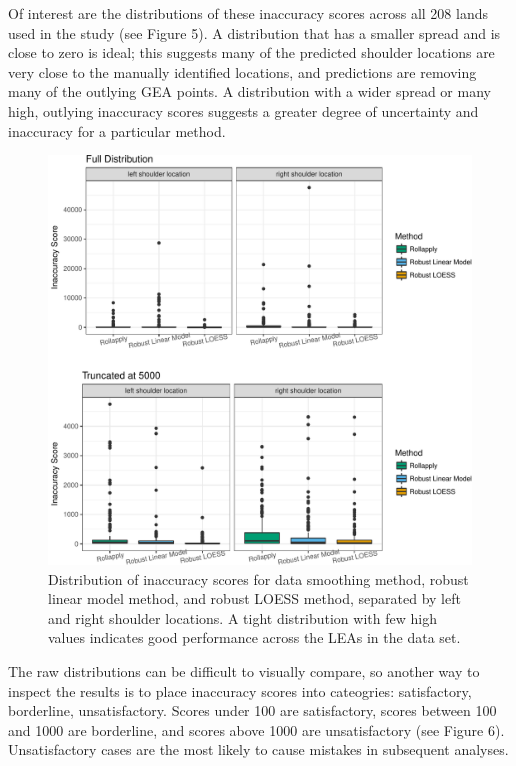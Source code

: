 \documentclass[]{article}
\begin{document}
Of interest are the distributions of these inaccuracy scores across all
208 lands used in the study (see Figure 5). A distribution that has a
smaller spread and is close to zero is ideal; this suggests many of the
predicted shoulder locations are very close to the manually identified
locations, and predictions are removing many of the outlying GEA points.
A distribution with a wider spread or many high, outlying inaccuracy
scores suggests a greater degree of uncertainty and inaccuracy for a
particular method.

\begin{figure}
\centering
\includegraphics{writeup_files/figure-latex/unnamed-chunk-5-1.pdf}
\caption{Distribution of inaccuracy scores for data smoothing method,
robust linear model method, and robust LOESS method, separated by left
and right shoulder locations. A tight distribution with few high values
indicates good performance across the LEAs in the data set.}
\end{figure}

The raw distributions can be difficult to visually compare, so another
way to inspect the results is to place inaccuracy scores into
cateogries: satisfactory, borderline, unsatisfactory. Scores under 100
are satisfactory, scores between 100 and 1000 are borderline, and scores
above 1000 are unsatisfactory (see Figure 6). Unsatisfactory cases are
the most likely to cause mistakes in subsequent analyses.
\end{document}
